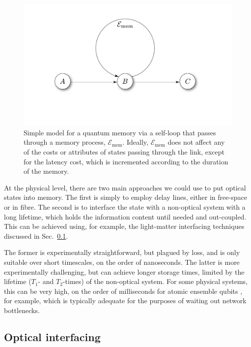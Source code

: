 \documentclass[aps,rmp,twocolumn,amsmath,amssymb,nofootinbib,superscriptaddress,longbibliography,floatfix]{revtex4-1}
\begin{document}
\begin{figure}[!htb]
\includegraphics[width=0.7\columnwidth]{memory}
\caption{Simple model for a quantum memory via a self-loop that passes through a memory process, $\mathcal{E}_\mathrm{mem}$. Ideally, $\mathcal{E}_\mathrm{mem}$ does not affect any of the costs or attributes of states passing through the link, except for the latency cost, which is incremented according to the duration of the memory.} \label{fig:memory}
\end{figure}

At the physical level, there are two main approaches we could use to put optical states into memory. The first is simply to employ delay lines, either in free-space or in fibre. The second is to interface the state with a non-optical system with a long lifetime, which holds the information content until needed and out-coupled. This can be achieved using, for example, the light-matter interfacing techniques discussed in Sec.~\ref{sec:opt_inter}.

The former is experimentally straightforward, but plagued by loss, and is only suitable over short timescales, on the order of nanoseconds. The latter is more experimentally challenging, but can achieve longer storage times, limited by the lifetime ($T_1$- and $T_2$-times) of the non-optical system. For some physical systems, this can be very high, on the order of milliseconds for atomic ensemble qubits \cite{bib:Duan02, bib:LauratKimble07}, for example, which is typically adequate for the purposes of waiting out network bottlenecks.

%
%

\subsection{Optical interfacing} \label{sec:opt_inter}
\end{document}
